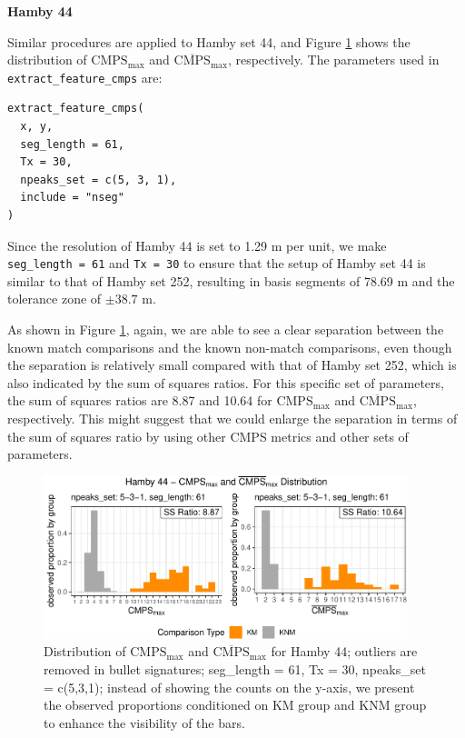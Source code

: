 \textbf{Hamby 44}

Similar procedures are applied to Hamby set 44, and Figure \ref{fig:result1-44} shows the distribution of \(\mathrm{CMPS_{max}}\) and \(\mathrm{\overline{CMPS}_{max}}\), respectively.
The parameters used in \texttt{extract\_feature\_cmps} are:

\begin{verbatim}
extract_feature_cmps(
  x, y,
  seg_length = 61,
  Tx = 30,
  npeaks_set = c(5, 3, 1),
  include = "nseg"
)
\end{verbatim}

Since the resolution of Hamby 44 is set to 1.29 \textmu m per unit, we make \texttt{seg\_length\ =\ 61} and \texttt{Tx\ =\ 30} to ensure that the setup of Hamby set 44 is similar to that of Hamby set 252, resulting in basis segments of 78.69 \textmu m and the tolerance zone of \(\pm 38.7\) \textmu m.

As shown in Figure \ref{fig:result1-44}, again, we are able to see a clear separation between the known match comparisons and the known non-match comparisons, even though the separation is relatively small compared with that of Hamby set 252, which is also indicated by the sum of squares ratios.
For this specific set of parameters, the sum of squares ratios are 8.87 and 10.64 for \(\mathrm{CMPS_{max}}\) and \(\mathrm{\overline{CMPS}_{max}}\), respectively.
This might suggest that we could enlarge the separation in terms of the sum of squares ratio by using other CMPS metrics and other sets of parameters.

\begin{figure}

{\centering \includegraphics[width=400px]{ju-hofmann_files/figure-latex/result1-44-1} 

}

\caption{Distribution of $\mathrm{CMPS_{max}}$ and $\mathrm{\overline{CMPS}_{max}}$ for Hamby 44; outliers are removed in bullet signatures; seg\_length = 61, Tx = 30, npeaks\_set = c(5,3,1); instead of showing the counts on the y-axis, we present the observed proportions conditioned on KM group and KNM group to enhance the visibility of the bars. }\label{fig:result1-44}
\end{figure}

